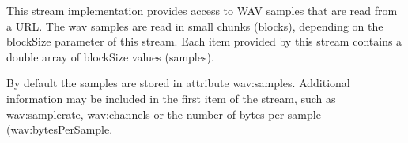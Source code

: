 This stream implementation provides access to WAV samples that are
read from a URL. The wav samples are read in small chunks (blocks),
depending on the {\ttfamily blockSize} parameter of this stream.
Each item provided by this stream contains a double array of
{\ttfamily blockSize} values (samples).

By default the samples are stored in attribute {\ttfamily wav:samples}.
Additional information may be included in the first item of the stream,
such as {\ttfamily wav:samplerate}, {\ttfamily wav:channels} or the
number of bytes per sample ({\ttfamily wav:bytesPerSample}.